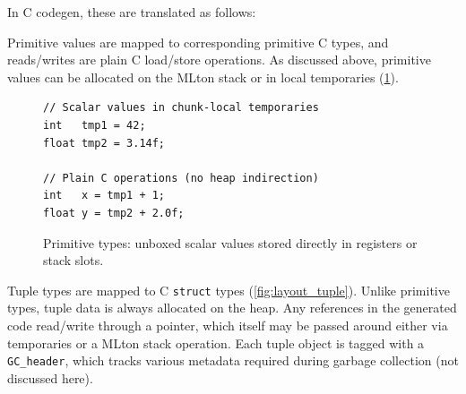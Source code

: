 \newpage
In C codegen, these are translated as follows:

Primitive values are mapped to corresponding primitive C types, and reads/writes
are plain C load/store operations. As discussed above, primitive values can be
allocated on the MLton stack or in local temporaries
(\cref{fig:layout_primitive}).

\begin{figure}[H]
  \centering
  \begin{minipage}[c]{0.48\textwidth}
\begin{verbatim}
// Scalar values in chunk-local temporaries
int   tmp1 = 42;
float tmp2 = 3.14f;

// Plain C operations (no heap indirection)
int   x = tmp1 + 1;
float y = tmp2 + 2.0f;
\end{verbatim}
  \end{minipage}%
  \hfill
  \begin{minipage}[c]{0.50\textwidth}
    \centering
  \end{minipage}
  \caption{Primitive types: unboxed scalar values stored directly in registers or stack slots.}
  \label{fig:layout_primitive}
\end{figure}


Tuple types are mapped to C \texttt{struct} types (\cref{fig:layout_tuple}).
Unlike primitive types, tuple data is always allocated on the heap. Any
references in the generated code read/write through a pointer, which itself may
be passed around either via temporaries or a MLton stack operation. Each tuple
object is tagged with a \texttt{GC\_header}, which tracks various metadata
required during garbage collection (not discussed here).


